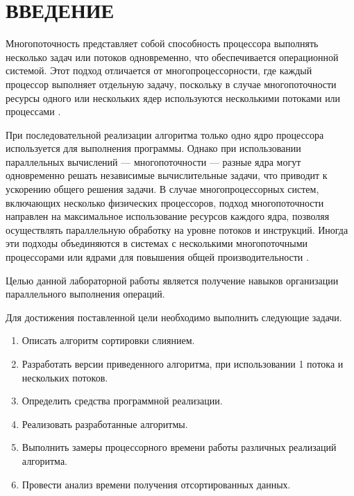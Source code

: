 \chapter*{\hfill{\centering  ВВЕДЕНИЕ}\hfill}

Многопоточность представляет собой способность процессора выполнять несколько задач или потоков одновременно, что обеспечивается операционной системой. Этот подход отличается от многопроцессорности, где каждый процессор выполняет отдельную задачу, поскольку в случае многопоточности ресурсы одного или нескольких ядер используются несколькими потоками или процессами \cite{muti-thread}.

При последовательной реализации алгоритма только одно ядро процессора используется для выполнения программы. Однако при использовании параллельных вычислений --- многопоточности --- разные ядра могут одновременно решать независимые вычислительные задачи, что приводит к ускорению общего решения задачи.
В случае многопроцессорных систем, включающих несколько физических процессоров, подход многопоточности направлен на максимальное использование ресурсов каждого ядра, позволяя осуществлять параллельную обработку на уровне потоков и инструкций. Иногда эти подходы объединяются в системах с несколькими многопоточными процессорами или ядрами для повышения общей производительности \cite{muti-thread}.


Целью данной лабораторной работы является  получение навыков организации параллельного выполнения операций.

Для достижения поставленной цели необходимо выполнить следующие задачи.
\label{sec:targets}
\begin{enumerate}
	\item Описать алгоритм сортировки слиянием.
	\item Разработать версии  приведенного алгоритма, при использовании 1 потока и нескольких потоков.
	\item Определить средства программной реализации.
	\item Реализовать разработанные алгоритмы.
	\item Выполнить замеры процессорного времени работы различных реализаций алгоритма.
	\item Провести анализ времени получения отсортированных данных.
\end{enumerate}